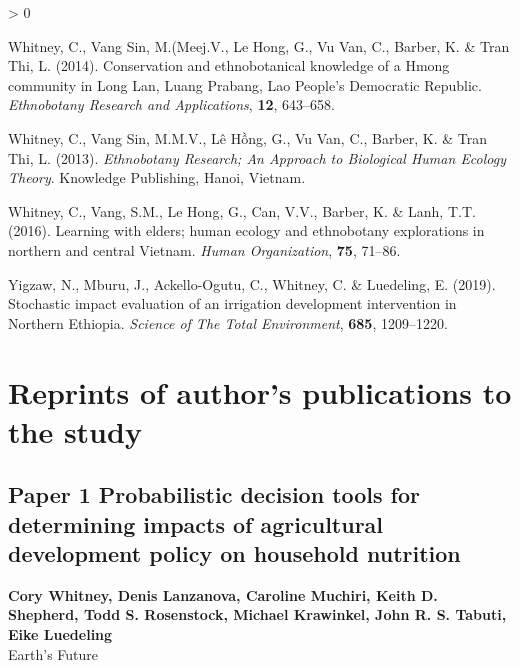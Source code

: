 \documentclass[
]{article}
\newlength{\cslhangindent}
\newenvironment{CSLReferences}[2] %
 {%
  \setlength{\parindent}{0pt}
  \ifodd #1 \everypar{\setlength{\hangindent}{\cslhangindent}}\ignorespaces\fi
  \ifnum #2 > 0
  \setlength{\parskip}{#2\baselineskip}
  \fi
 }%
 {}
\begin{document}
\begin{CSLReferences}{1}{0}
\leavevmode{}%
Whitney, C., Vang Sin, M.(Meej.V., Le Hong, G., Vu Van, C., Barber, K.
\& Tran Thi, L. (2014). Conservation and ethnobotanical knowledge of a
{Hmong} community in {Long} {Lan}, {Luang} {Prabang}, {Lao} {People}'s
{Democratic} {Republic}. \emph{Ethnobotany Research and Applications},
\textbf{12}, 643--658.

\leavevmode{}%
Whitney, C., Vang Sin, M.M.V., Lê Hồng, G., Vu Van, C., Barber, K. \&
Tran Thi, L. (2013). \emph{Ethnobotany {Research}; {An} {Approach} to
{Biological} {Human} {Ecology} {Theory}}. Knowledge Publishing, Hanoi,
Vietnam.

\leavevmode{}%
Whitney, C., Vang, S.M., Le Hong, G., Can, V.V., Barber, K. \& Lanh,
T.T. (2016). Learning with elders; human ecology and ethnobotany
explorations in northern and central {Vietnam}. \emph{Human
Organization}, \textbf{75}, 71--86.

\leavevmode{}%
Yigzaw, N., Mburu, J., Ackello-Ogutu, C., Whitney, C. \& Luedeling, E.
(2019). Stochastic impact evaluation of an irrigation development
intervention in {Northern} {Ethiopia}. \emph{Science of The Total
Environment}, \textbf{685}, 1209--1220.

\end{CSLReferences}

\newpage

\hypertarget{appendix-iii}{%
\section{Reprints of author's publications to the
study}\label{appendix-iii}}

\newpage

\fancyhf{} \fancyfoot[R]{\thepage}

\newpage

\hypertarget{whitney_probabilistic_2018}{%
\subsection{Paper 1 Probabilistic decision tools for determining impacts
of agricultural development policy on household
nutrition}\label{whitney_probabilistic_2018}}

\begin{center}
\vspace*{2cm}
{\Large \textbf{Cory Whitney, Denis Lanzanova, Caroline Muchiri, Keith D. Shepherd, Todd S. Rosenstock, Michael Krawinkel, John R. S. Tabuti, Eike Luedeling}} \\[0.5cm]
\vspace*{1cm}
{\Large Earth's Future} \\[2cm]
\end{center}

\end{document}
